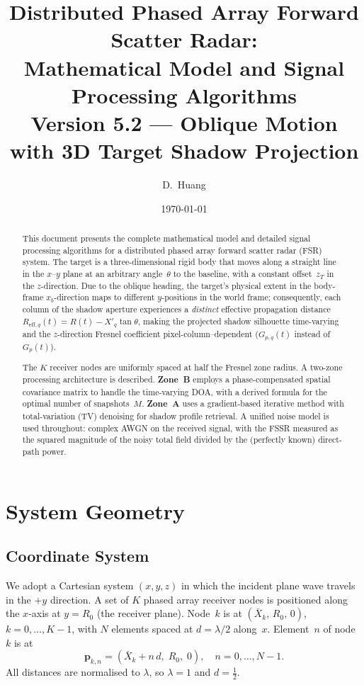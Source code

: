 \documentclass[11pt,a4paper]{article}
\title{Distributed Phased Array Forward Scatter Radar:\\
Mathematical Model and Signal Processing Algorithms\\[6pt]
\large Version 5.2 --- Oblique Motion with 3D Target Shadow Projection}
\author{D.~Huang}
\date{\today}
\begin{document}
\maketitle

\begin{abstract}
This document presents the complete mathematical model and detailed
signal processing algorithms for a distributed phased array forward
scatter radar (FSR) system.  The target is a three-dimensional rigid
body that moves along a straight line in the $x$--$y$ plane at an
arbitrary angle~$\theta$ to the baseline, with a constant
offset~$z_T$ in the $z$-direction.  Due to the oblique heading, the
target's physical extent in the body-frame $x_b$-direction maps to
different $y$-positions in the world frame; consequently, each column
of the shadow aperture experiences a \emph{distinct} effective
propagation distance $R_{\mathrm{eff},q}(t) = R(t) - X'_q\tan\theta$,
making the projected shadow silhouette time-varying and the
$z$-direction Fresnel coefficient pixel-column--dependent
($G_{p,q}(t)$ instead of $G_p(t)$).

The $K$ receiver nodes are uniformly spaced at half the Fresnel zone
radius.  A two-zone processing architecture is described.
\textbf{Zone~B} employs a phase-compensated spatial covariance matrix
to handle the time-varying DOA, with a derived formula for the
optimal number of snapshots~$M$.  \textbf{Zone~A} uses a
gradient-based iterative method with total-variation (TV) denoising
for shadow profile retrieval.  A unified noise model is used
throughout: complex AWGN on the received signal, with the FSSR
measured as the squared magnitude of the noisy total field divided by
the (perfectly known) direct-path power.
\end{abstract}

\tableofcontents
\newpage

\section{System Geometry}
\label{sec:geometry}

\subsection{Coordinate System}

We adopt a Cartesian system $(x,y,z)$ in which the incident plane wave
travels in the $+y$ direction.  A set of $K$ phased array receiver
nodes is positioned along the $x$-axis at $y=R_0$ (the receiver plane).
Node~$k$ is at $(\bar{X}_k,\,R_0,\,0)$, $k=0,\ldots,K{-}1$, with
$N$ elements spaced at $d=\lambda/2$ along~$x$.  Element~$n$ of
node~$k$ is at
\begin{equation}
  \mathbf{p}_{k,n} = (\bar{X}_k + n\,d,\;R_0,\;0),
  \quad n=0,\ldots,N{-}1.
  \label{eq:element_pos}
\end{equation}
All distances are normalised to $\lambda$, so $\lambda=1$ and
$d=\tfrac12$.
\end{document}
